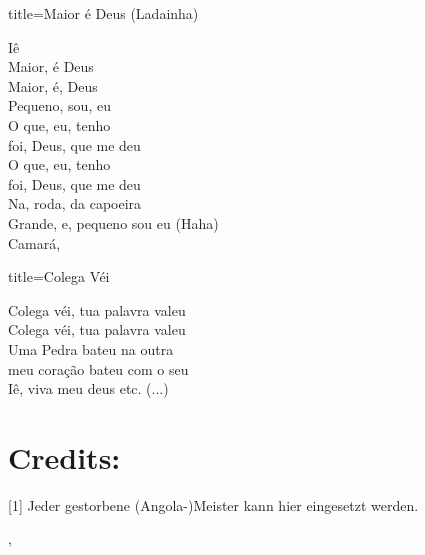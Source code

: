 \documentclass[fontsize=14pt, paper=a4, twoside, DIV=20]{scrreprt} %
\begin{document}
\begin{multicols*}{2}
\begin{song}{title={Maior é Deus (Ladainha)}}
    \begin{verse*}
Iê\,\\
Maior, é Deus\\
Maior, é, Deus\\
Pequeno, sou, eu\\
O que, eu, tenho\\
foi, Deus, que me deu\\
O que, eu, tenho\\
foi, Deus, que me deu\\
Na, roda, da capoeira\\
Grande, e, pequeno sou eu (Haha)\\
Camará,\\
    \end{verse*}
\end{song}

\columnbreak
\begin{song}{title={Colega Véi}}
        \begin{verse*}
            Colega véi, tua palavra valeu\\
            Colega véi, tua palavra valeu\\

            Uma Pedra bateu na outra\\
            meu coração bateu com o seu\\
            Iê, viva meu deus etc. (...)
        \end{verse*}
\end{song}

\chapter*{Credits:}
[1] Jeder  gestorbene (Angola-)Meister kann hier eingesetzt werden.

\end{multicols*},
\end{document}
